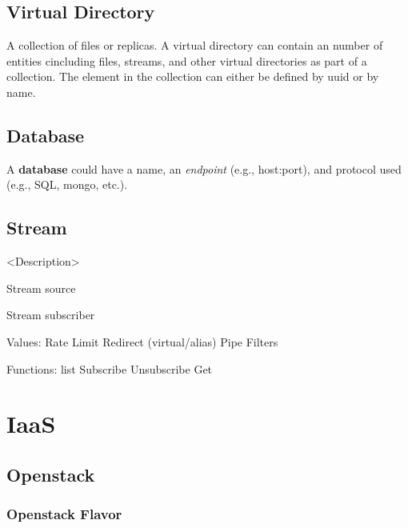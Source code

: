 \documentclass[9pt,twocolumn,twoside]{styles/osajnl}
\begin{document}
\subsection{Virtual Directory}

A collection of files or replicas. A virtual directory can contain an
number of entities cincluding files, streams, and other virtual
directories as part of a collection. The element in the collection can
either be defined by uuid or by name. 


\subsection{Database}

A \textbf{database} could have a name, an \textit{endpoint} (e.g., host:port),
and protocol used (e.g., SQL, mongo, etc.).


\subsection{Stream} 

<Description> 
 
Stream source 
 
Stream subscriber 
 
Values: 
Rate 
Limit 
Redirect (virtual/alias) 
Pipe 
Filters 
 
Functions: 
list 
Subscribe 
Unsubscribe 
Get 
\section{IaaS}


\subsection{Openstack}

\subsubsection{Openstack Flavor}
\end{document}

